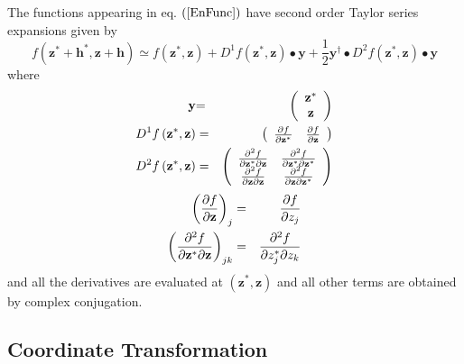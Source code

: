 \documentclass{article}
\begin{document}
The functions appearing in eq. $\left( \ref{EnFunc}\right) $ have second
order Taylor series expansions given by 
\begin{equation}
f\left( \mathbf{z}^{\ast }+\mathbf{h}^{\ast },\mathbf{z}+\mathbf{h}\right)
\simeq f\left( \mathbf{z}^{\ast },\mathbf{z}\right) +D^{1}f\left( \mathbf{z}%
^{\ast },\mathbf{z}\right) \bullet \mathbf{y}+\frac{1}{2}\mathbf{y}^{\dagger
}\bullet D^{2}f\left( \mathbf{z}^{\ast },\mathbf{z}\right) \bullet \mathbf{y}
\end{equation}%
where%
\begin{eqnarray}
\mathbf{y} &\mathbf{=}&\left( 
\begin{array}{c}
\mathbf{z}^{\ast } \\ 
\mathbf{z}%
\end{array}%
\right)  \notag \\
D^{1}f\left( \mathbf{z}^{\ast },\mathbf{z}\right) &=&\left( 
\begin{array}{cc}
\frac{\partial f}{\partial \mathbf{z}^{\ast }} & \frac{\partial f}{\partial 
\mathbf{z}}%
\end{array}%
\right)  \notag \\
D^{2}f\left( \mathbf{z}^{\ast },\mathbf{z}\right) &=&\left( 
\begin{array}{cc}
\frac{\partial ^{2}f}{\partial \mathbf{z}^{\ast }\partial \mathbf{z}} & 
\frac{\partial ^{2}f}{\partial \mathbf{z}^{\ast }\partial \mathbf{z}^{\ast }}
\\ 
\frac{\partial ^{2}f}{\partial \mathbf{z}\partial \mathbf{z}} & \frac{%
\partial ^{2}f}{\partial \mathbf{z}\partial \mathbf{z}^{\ast }}%
\end{array}%
\right)
\end{eqnarray}%
\begin{eqnarray}
\left( \frac{\partial f}{\partial \mathbf{z}}\right) _{j} &=&\frac{\partial f%
}{\partial z_{j}}  \notag \\
\left( \frac{\partial ^{2}f}{\partial \mathbf{z}^{\ast }\partial \mathbf{z}}%
\right) _{jk} &=&\frac{\partial ^{2}f}{\partial z_{j}^{\ast }\partial z_{k}}
\end{eqnarray}%
and all the derivatives are evaluated at $\left( \mathbf{z}^{\ast },\mathbf{z%
}\right) $ and all other terms are obtained by complex conjugation.

\subsection{Coordinate Transformation}
\end{document}
